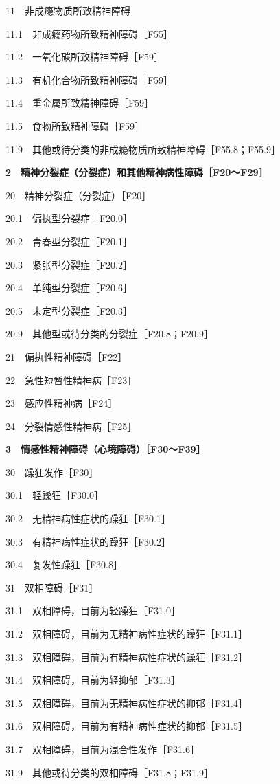 11　非成瘾物质所致精神障碍

11.1　非成瘾药物所致精神障碍［F55］

11.2　一氧化碳所致精神障碍［F59］

11.3　有机化合物所致精神障碍［F59］

11.4　重金属所致精神障碍［F59］

11.5　食物所致精神障碍［F59］

11.9　其他或待分类的非成瘾物质所致精神障碍［F55.8；F55.9］

\textbf{2　精神分裂症（分裂症）和其他精神病性障碍［F20～F29］}

20　精神分裂症（分裂症）［F20］

20.1　偏执型分裂症［F20.0］

20.2　青春型分裂症［F20.1］

20.3　紧张型分裂症［F20.2］

20.4　单纯型分裂症［F20.6］

20.5　未定型分裂症［F20.3］

20.9　其他型或待分类的分裂症［F20.8；F20.9］

21　偏执性精神障碍［F22］

22　急性短暂性精神病［F23］

23　感应性精神病［F24］

24　分裂情感性精神病［F25］

\textbf{3　情感性精神障碍（心境障碍）［F30～F39］}

30　躁狂发作［F30］

30.1　轻躁狂［F30.0］

30.2　无精神病性症状的躁狂［F30.1］

30.3　有精神病性症状的躁狂［F30.2］

30.4　复发性躁狂［F30.8］

31　双相障碍［F31］

31.1　双相障碍，目前为轻躁狂［F31.0］

31.2　双相障碍，目前为无精神病性症状的躁狂［F31.1］

31.3　双相障碍，目前为有精神病性症状的躁狂［F31.2］

31.4　双相障碍，目前为轻抑郁［F31.3］

31.5　双相障碍，目前为无精神病性症状的抑郁［F31.4］

31.6　双相障碍，目前为有精神病性症状的抑郁［F31.5］

31.7　双相障碍，目前为混合性发作［F31.6］

31.9　其他或待分类的双相障碍［F31.8；F31.9］

